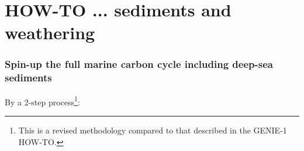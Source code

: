 \documentclass[11pt,fleqn]{book} %
\begin{document}

\newpage


\section{HOW-TO ... sediments and weathering}

%
\subsubsection{Spin-up the full marine carbon cycle including deep-sea sediments}\label{Spin-up the full marine carbon cycle including sediments}

\vspace{1mm}
By a 2-step process\footnote{This is a revised methodology compared to that described in the GENIE-1 HOW-TO.}:
\end{document}

